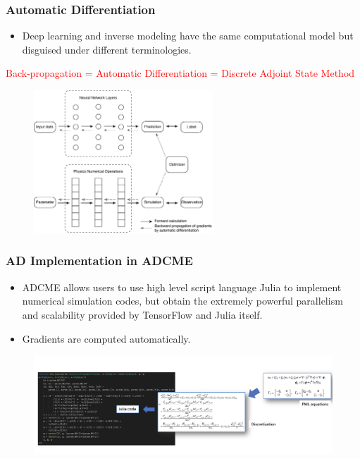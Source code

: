 \documentclass{beamer}
\begin{document}
\begin{frame}
	\frametitle{Automatic Differentiation}
	\begin{itemize}
		\item Deep learning and inverse modeling have the same computational model but disguised under different terminologies.
	\end{itemize}
	\begin{center}
	\small
	\textcolor{red}{
		Back-propagation = Automatic Differentiation = Discrete Adjoint State Method}
	\end{center}
	\begin{figure}[hbt]
  \includegraphics[width=0.6\textwidth]{../compare-NN-PDE.png}
\end{figure}
\end{frame}

\begin{frame}
	\frametitle{AD Implementation in ADCME}
	\begin{itemize}
		\item ADCME allows users to use high level script language Julia to implement numerical simulation codes, but obtain the extremely powerful parallelism and scalability provided by TensorFlow and Julia itself.
		\item Gradients are computed automatically. 
	\end{itemize}
	\begin{figure}[hbt]
  \includegraphics[width=1.0\textwidth]{../Julia.png}
\end{figure}
\end{frame}
\end{document}
